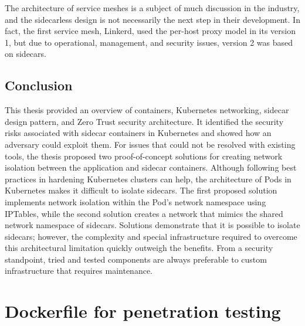 \documentclass[english, 12pt, a4paper, sci, utf8, a-2b, online]{aaltothesis}
\begin{document}
The architecture of service meshes is a subject of much discussion in the industry, and the sidecarless design is not necessarily the next step in their development.
In fact, the first service mesh, Linkerd, used the per-host proxy model in its version 1, but due to operational, management, and security issues, version 2 was based on sidecars.

\subsection{Conclusion}

This thesis provided an overview of containers, Kubernetes networking, sidecar design pattern, and Zero Trust security architecture.
It identified the security risks associated with sidecar containers in Kubernetes and showed how an adversary could exploit them.
For issues that could not be resolved with existing tools, the thesis proposed two proof-of-concept solutions for creating network isolation between the application and sidecar containers.
Although following best practices in hardening Kubernetes clusters can help, the architecture of Pods in Kubernetes makes it difficult to isolate sidecars.
The first proposed solution implements network isolation within the Pod's network namespace using IPTables, while the second solution creates a network that mimics the shared network namespace of sidecars.
Solutions demonstrate that it is possible to isolate sidecars; however, the complexity and special infrastructure required to overcome this architectural limitation quickly outweigh the benefits.
From a security standpoint, tried and tested components are always preferable to custom infrastructure that requires maintenance.

\clearpage

\thesisbibliography
\printbibliography

\clearpage

\thesisappendix

\section{Dockerfile for penetration testing} \label{app:malicious-sidecar}


\end{document}
